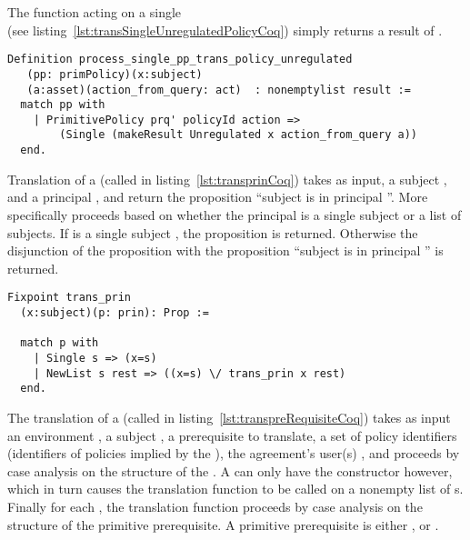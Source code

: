 The function  acting on a single \\  (see listing~\ref{lst:transSingleUnregulatedPolicyCoq}) simply returns a result of .



\begin{lstlisting}
Definition process_single_pp_trans_policy_unregulated
   (pp: primPolicy)(x:subject)
   (a:asset)(action_from_query: act)  : nonemptylist result :=
  match pp with
    | PrimitivePolicy prq' policyId action =>
        (Single (makeResult Unregulated x action_from_query a))
  end.
\end{lstlisting}




Translation of a  (called  in listing~\ref{lst:transprinCoq}) takes as input, a subject , and a principal , and return the proposition ``subject  is in principal ''. More specifically  proceeds based on whether the principal  is a single subject or a list of subjects. If  is a single subject , the proposition  is returned. Otherwise the disjunction of the proposition  with the proposition ``subject  is in principal '' is returned.

\begin{minipage}{\linewidth}
\begin{lstlisting}
Fixpoint trans_prin
  (x:subject)(p: prin): Prop :=

  match p with
    | Single s => (x=s)
    | NewList s rest => ((x=s) \/ trans_prin x rest)
  end.
\end{lstlisting}
\end{minipage}


The translation of a  (called  in listing~\ref{lst:transpreRequisiteCoq}) takes as input an environment , a subject , a prerequisite  to translate, a set of policy identifiers  (identifiers of policies implied by the ), the agreement's user(s) , and proceeds by case analysis on the structure of the . A  can only have the constructor  however, which in turn causes the translation function  to be called on a nonempty list of s. Finally for each , the translation function  proceeds by case analysis on the structure of the primitive prerequisite. A primitive prerequisite is either ,  or .

